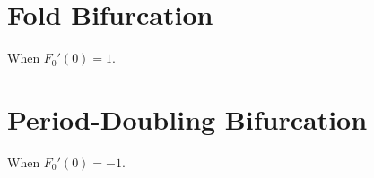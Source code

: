 \documentclass[11pt]{article}
\begin{document}
\section{Fold Bifurcation}
When $F_0'(0) = 1$.
\section{Period-Doubling Bifurcation}
When $F_0'(0) = -1$.
\end{document}

